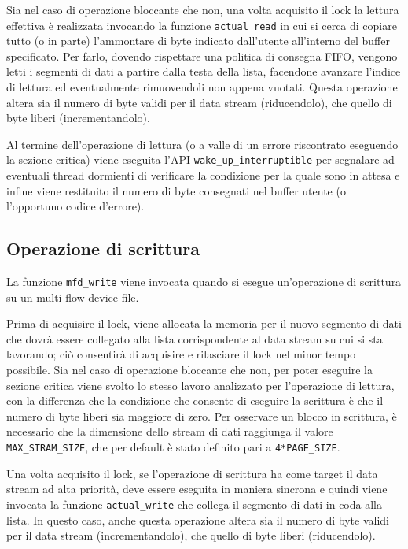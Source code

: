 \documentclass{article}
\begin{document}
Sia nel caso di operazione bloccante che non, una volta acquisito il lock la lettura effettiva è realizzata invocando la funzione \texttt{actual\_read} in cui si cerca di copiare tutto (o in parte) l'ammontare di byte indicato dall'utente all'interno del buffer specificato. Per farlo, dovendo rispettare una politica di consegna FIFO, vengono letti i segmenti di dati a partire dalla testa della lista, facendone avanzare l'indice di lettura ed eventualmente rimuovendoli non appena vuotati. Questa operazione altera sia il numero di byte validi per il data stream (riducendolo), che quello di byte liberi (incrementandolo).

Al termine dell'operazione di lettura (o a valle di un errore riscontrato eseguendo la sezione critica) viene eseguita l'API \texttt{wake\_up\_interruptible} per segnalare ad eventuali thread dormienti di verificare la condizione per la quale sono in attesa e infine viene restituito il numero di byte consegnati nel buffer utente (o l'opportuno codice d'errore).

\subsection{Operazione di scrittura}
La funzione \texttt{mfd\_write} viene invocata quando si esegue un'operazione di scrittura su un multi-flow device file.

Prima di acquisire il lock, viene allocata la memoria per il nuovo segmento di dati che dovrà essere collegato alla lista corrispondente al data stream su cui si sta lavorando; ciò consentirà di acquisire e rilasciare il lock nel minor tempo possibile. Sia nel caso di operazione bloccante che non, per poter eseguire la sezione critica viene svolto lo stesso lavoro analizzato per l'operazione di lettura, con la differenza che la condizione che consente di eseguire la scrittura è che il numero di byte liberi sia maggiore di zero. Per osservare un blocco in scrittura, è necessario che la dimensione dello stream di dati raggiunga il valore \texttt{MAX\_STRAM\_SIZE}, che per default è stato definito pari a \texttt{4*PAGE\_SIZE}.

Una volta acquisito il lock, se l'operazione di scrittura ha come target il data stream ad alta priorità, deve essere eseguita in maniera sincrona e quindi viene invocata la funzione \texttt{actual\_write} che collega il segmento di dati in coda alla lista. In questo caso, anche questa operazione altera sia il numero di byte validi per il data stream (incrementandolo), che quello di byte liberi (riducendolo).
\end{document}
